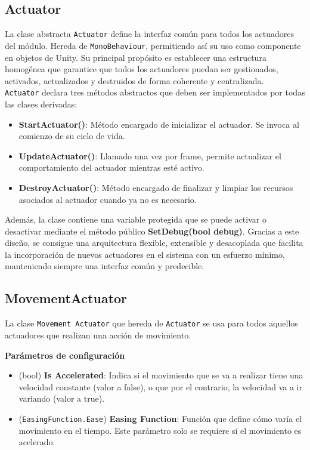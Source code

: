\subsection{Actuator}

La clase abstracta \texttt{Actuator} define la interfaz común para todos los actuadores del módulo. Hereda de \texttt{MonoBehaviour}, permitiendo así su uso como componente en objetos de Unity. Su principal propósito es establecer una estructura homogénea que garantice que todos los actuadores puedan ser gestionados, activados, actualizados y destruidos de forma coherente y centralizada.\\


\texttt{Actuator} declara tres métodos abstractos que deben ser implementados por todas las clases derivadas:

\begin{itemize}
\item \textbf{StartActuator()}: Método encargado de inicializar el actuador. Se invoca al comienzo de su ciclo de vida.
\item \textbf{UpdateActuator()}: Llamado una vez por frame, permite actualizar el comportamiento del actuador mientras esté activo.
\item \textbf{DestroyActuator()}: Método encargado de finalizar y limpiar los recursos asociados al actuador cuando ya no es necesario.
\end{itemize}

Además, la clase contiene una variable protegida que se puede activar o desactivar mediante el método público \textbf{SetDebug(bool debug)}.
Gracias a este diseño, se consigue una arquitectura flexible, extensible y desacoplada que facilita la incorporación de nuevos actuadores en el sistema con un esfuerzo mínimo, manteniendo siempre una interfaz común y predecible.

\subsection{MovementActuator}
La clase \texttt{Movement Actuator} que hereda de \texttt{Actuator} se usa para todos aquellos actuadores que realizan una acción de movimiento.

\textbf{Parámetros de configuración}
\begin{itemize}
	\item (bool) \textbf{Is Accelerated}: Indica si el movimiento que se va a realizar tiene una velocidad constante (valor a false), o que por el contrario, la velocidad va a ir variando (valor a true).
	\item (\texttt{EasingFunction.Ease}) \textbf{Easing Function}: Función que define cómo varía el movimiento en el tiempo. Este parámetro solo se requiere si el movimiento es acelerado.
\end{itemize}

